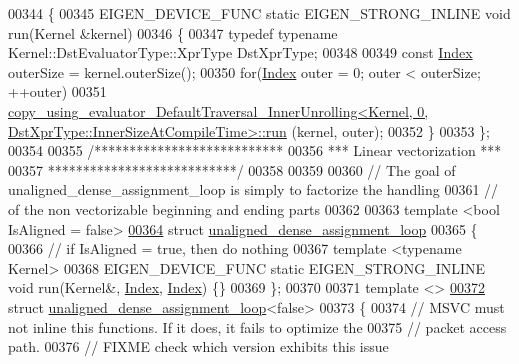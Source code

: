\begin{DoxyCode}
00344 \{
00345   EIGEN\_DEVICE\_FUNC \textcolor{keyword}{static} EIGEN\_STRONG\_INLINE \textcolor{keywordtype}{void} run(Kernel &kernel)
00346   \{
00347     \textcolor{keyword}{typedef} \textcolor{keyword}{typename} Kernel::DstEvaluatorType::XprType DstXprType;
00348 
00349     \textcolor{keyword}{const} \hyperlink{namespace_eigen_a62e77e0933482dafde8fe197d9a2cfde}{Index} outerSize = kernel.outerSize();
00350     \textcolor{keywordflow}{for}(\hyperlink{namespace_eigen_a62e77e0933482dafde8fe197d9a2cfde}{Index} outer = 0; outer < outerSize; ++outer)
00351       
      \hyperlink{struct_eigen_1_1internal_1_1copy__using__evaluator___default_traversal___inner_unrolling}{copy\_using\_evaluator\_DefaultTraversal\_InnerUnrolling<Kernel, 0, DstXprType::InnerSizeAtCompileTime>::run}
      (kernel, outer);
00352   \}
00353 \};
00354 
00355 \textcolor{comment}{/***************************}
00356 \textcolor{comment}{*** Linear vectorization ***}
00357 \textcolor{comment}{***************************/}
00358 
00359 
00360 \textcolor{comment}{// The goal of unaligned\_dense\_assignment\_loop is simply to factorize the handling}
00361 \textcolor{comment}{// of the non vectorizable beginning and ending parts}
00362 
00363 \textcolor{keyword}{template} <\textcolor{keywordtype}{bool} IsAligned = false>
\hyperlink{struct_eigen_1_1internal_1_1unaligned__dense__assignment__loop}{00364} \textcolor{keyword}{struct }\hyperlink{struct_eigen_1_1internal_1_1unaligned__dense__assignment__loop}{unaligned\_dense\_assignment\_loop}
00365 \{
00366   \textcolor{comment}{// if IsAligned = true, then do nothing}
00367   \textcolor{keyword}{template} <\textcolor{keyword}{typename} Kernel>
00368   EIGEN\_DEVICE\_FUNC \textcolor{keyword}{static} EIGEN\_STRONG\_INLINE \textcolor{keywordtype}{void} run(Kernel&, \hyperlink{namespace_eigen_a62e77e0933482dafde8fe197d9a2cfde}{Index}, 
      \hyperlink{namespace_eigen_a62e77e0933482dafde8fe197d9a2cfde}{Index}) \{\}
00369 \};
00370 
00371 \textcolor{keyword}{template} <>
\hyperlink{struct_eigen_1_1internal_1_1unaligned__dense__assignment__loop_3_01false_01_4}{00372} \textcolor{keyword}{struct }\hyperlink{struct_eigen_1_1internal_1_1unaligned__dense__assignment__loop}{unaligned\_dense\_assignment\_loop}<false>
00373 \{
00374   \textcolor{comment}{// MSVC must not inline this functions. If it does, it fails to optimize the}
00375   \textcolor{comment}{// packet access path.}
00376   \textcolor{comment}{// FIXME check which version exhibits this issue}

\end{DoxyCode}
